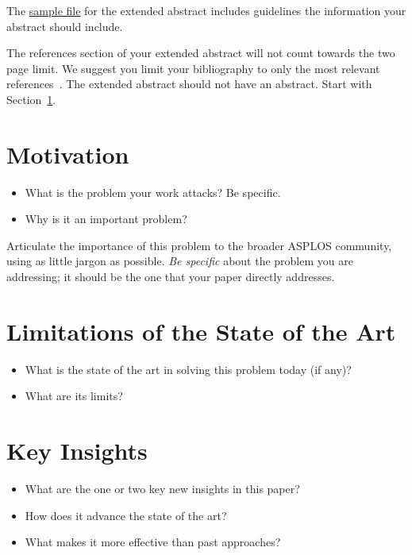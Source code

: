 The \href{ https://asplos-conference.org/wp-content/uploads/2020/06/asplos21-extended-abstract-template.pdf}{sample file} for the
extended abstract includes guidelines the information your abstract
should include.

The references section of your extended abstract will not count
towards the two page limit. We suggest you limit your bibliography to
only the most relevant references~\cite{lamport94}.
The extended abstract should not have an abstract. Start with Section~\ref{sec:motivation}.

\section{Motivation}
\label{sec:motivation}

\begin{itemize}
\item What is the problem your work attacks? Be specific.
\item Why is it an important problem?
\end{itemize}

\vspace{1em}

\noindent
Articulate the importance of this problem to the broader ASPLOS
community, using as little jargon as possible. \emph{Be specific}
about the problem you are addressing; it should be the one that your
paper directly addresses.

\section{Limitations of the State of the Art}
\label{sec:limitations}

\begin{itemize}
\item What is the state of the art in solving this problem today (if any)?
\item What are its limits?
\end{itemize}

\section{Key Insights}
\label{sec:key-insights}

\begin{itemize}
\item What are the one or two key new insights in this paper?
\item How does it advance the state of the art?
\item What makes it more effective than past approaches?
\end{itemize}

